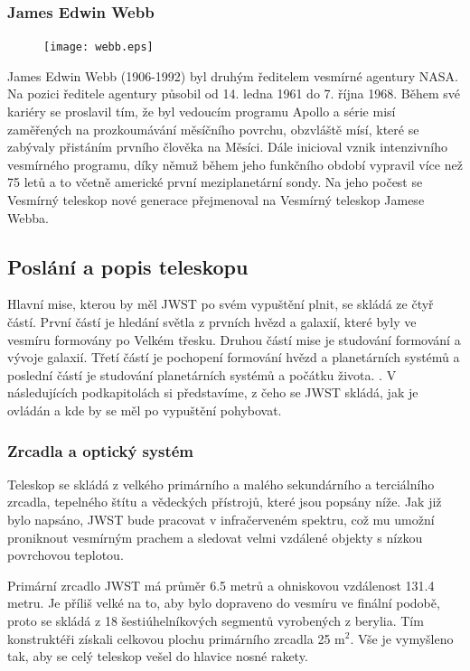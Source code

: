\documentclass[a4paper,11pt]{article}
\begin{document}
\subsubsection{James Edwin Webb}
\begin{figure}
\texttt{[image: webb.eps]}
\end{figure}
James Edwin Webb (1906-1992) byl druhým ředitelem vesmírné agentury NASA. Na pozici ředitele agentury působil od 14. ledna 1961 do 7. října 1968. Během své kariéry se proslavil tím, že byl vedoucím programu Apollo a série misí zaměřených na prozkoumávání měsíčního povrchu, obzvláště mísí, které se zabývaly přistáním prvního člověka na Měsíci. 
Dále inicioval vznik intenzivního vesmírného programu, díky němuž během jeho funkčního období vypravil více než 75 letů a to včetně americké první meziplanetární sondy. Na jeho počest se Vesmírný teleskop nové generace přejmenoval na Vesmírný teleskop Jamese Webba.
\\

\subsection{Poslání a popis teleskopu}
Hlavní mise, kterou by měl JWST po svém vypuštění plnit, se skládá ze čtyř částí.  První částí je hledání světla z prvních hvězd a galaxií, které byly ve vesmíru formovány po Velkém třesku. Druhou částí mise je studování formování a vývoje galaxií. Třetí částí je pochopení formování hvězd a planetárních systémů a poslední částí je studování planetárních systémů a počátku života. \cite{wikipediaWebbEn}. V následujících podkapitolách si představíme, z čeho se JWST skládá, jak je ovládán a kde by se měl po vypuštění pohybovat.

\subsubsection{Zrcadla a optický systém}
Teleskop se skládá z velkého primárního a malého sekundárního a terciálního zrcadla, tepelného štítu a věde\-ckých přístrojů, které jsou popsány níže. Jak již bylo napsáno, JWST bude pracovat v infračerveném spektru, což mu umožní proniknout vesmírným prachem a sledovat velmi vzdálené objekty s nízkou povrchovou teplotou.

Primární zrcadlo JWST má průměr 6.5 metrů a ohniskovou vzdálenost 131.4 metru. Je příliš velké na to, aby bylo dopraveno do vesmíru ve finální podobě, proto se skládá z 18 šestiúhelníkových segmentů vyrobených z berylia. Tím konstruktéři získali celkovou plochu primárního zrcadla 25 m$^2$. Vše je vymyšleno tak, aby se celý teleskop vešel do hlavice nosné rakety.
\end{document}
